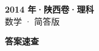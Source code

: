 \documentclass[zihao=-4, a4paper]{ctexart}
\begin{document}
\begin{center}
  {\Large\bfseries 2014 年·陕西卷·理科}\\[4pt]
  {\large 数学 · 简答版}
\end{center}
\medskip
{}

\clearpage
{}
\begin{center}{\Large\bfseries 答案速查}\end{center}
\medskip

\end{document}
